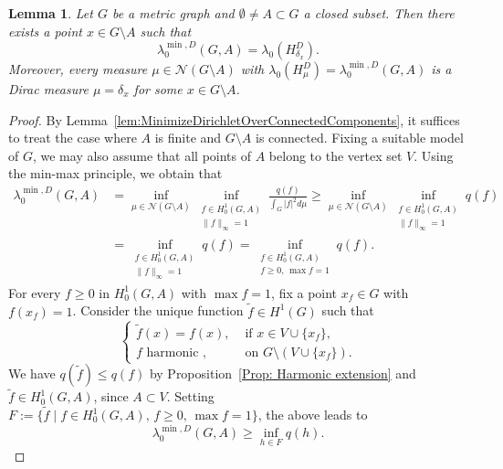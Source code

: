 \documentclass[reqno]{amsart}
\theoremstyle{plain}
\newtheorem{lem}[thm]{Lemma}
\theoremstyle{definition}
\theoremstyle{remark}
\numberwithin{equation}{section}
\newcommand{\cN}{\mathcal{N}}
\begin{document}
\begin{lem} \label{lem:MinimizingMeasuresDirichletEigenvalue} Let $G$ be a metric graph and $\emptyset \neq A\subset G$ a closed subset. Then there exists a point $x \in G\setminus A$ such that
\[
\lambda_{0}^{\min, D}(G, A) = \lambda_0 (H_{\delta_x}^D). 
\]
Moreover, every measure $\mu \in \cN(G\setminus A)$ with $\lambda_0(H_\mu^D) = \lambda_{0}^{\min, D}(G, A)$ is a Dirac measure $\mu = \delta_x$ for some $x \in G \setminus A$. 
\end{lem}
\begin{proof} By Lemma~\ref{lem:MinimizeDirichletOverConnectedComponents}, it suffices to treat the case where $A$ is finite and $G \setminus A$ is connected. Fixing a suitable model of $G$, we may also assume that all points of $A$ belong to the vertex set $V$. Using the min-max principle, we obtain that
\begin{align*}
	\lambda^{\min, D}_0 (G,A) &= \inf_{\mu \in \cN(G \setminus A)} \inf_{\substack{f \in H^1_0(G,A) \\ \|f\|_\infty =1}} \frac{q(f)}{\int_{G} |f|^2 d\mu} \geq \inf_{\mu \in \cN(G \setminus A)} \inf_{\substack{f \in H^1_0(G,A) \\ \|f\|_\infty =1}} q(f) \\
	&=  \inf_{\substack{f \in H^1_0(G,A) \\ \|f\|_\infty =1}} q(f) = \inf_{\substack{f \in H^1_0(G,A) \\ f \ge0, \, \max f = 1}} q(f).
\end{align*}
For every $f \ge 0$ in $H^1_0(G,A)$ with $\max f =1$, fix a point $x_f \in G$ with $f(x_f)=1$. Consider the unique function $\widetilde{f} \in H^1(G)$ such that 
\[
\begin{cases}
	\widetilde{f} (x) = f(x), & \text{ if } x \in V \cup \{x_f\}, \\
	f \text{ harmonic }, & \text{ on } G\setminus (V \cup \{x_f\} ).
\end{cases}
\]
We have $q(\widetilde f) \le q(f)$ by Proposition~\ref{Prop: Harmonic extension} and $\widetilde{f} \in H_0^1(G,A)$, since $A \subset V$. Setting $F := \{\widetilde{ f} \; | \; f \in H^1_0 (G,A), \, f \ge 0, \, \max f = 1 \}$, the above leads to
\[
\lambda^{\min, D}_0(G,A)  \geq \inf_{h \in F} q(h). 
\]


\end{proof}
\end{document}
